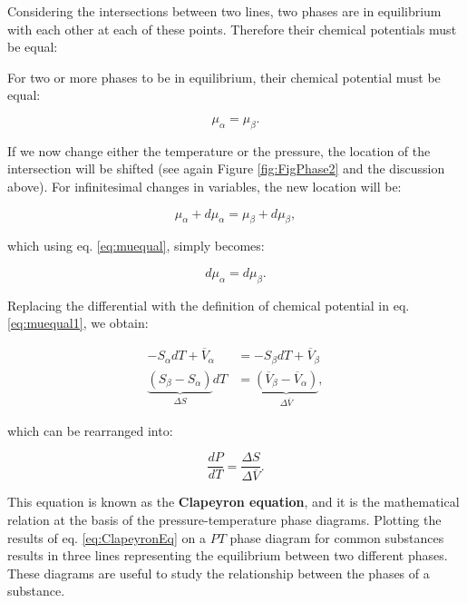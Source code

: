 \documentclass[
  9pt,
]{extbook}
\theoremstyle{definition}
\theoremstyle{definition}
\theoremstyle{definition}
\theoremstyle{definition}
\theoremstyle{remark}
\begin{document}
Considering the intersections between two lines, two phases are in equilibrium with each other at each of these points. Therefore their chemical potentials must be equal:

For two or more phases to be in equilibrium, their chemical potential must be equal:

\begin{equation}
\mu_{\alpha} = \mu_{\beta}.
\label{eq:muequal}
\end{equation}

If we now change either the temperature or the pressure, the location of the intersection will be shifted (see again Figure \ref{fig:FigPhase2} and the discussion above). For infinitesimal changes in variables, the new location will be:

\begin{equation}
\mu_{\alpha} + d\mu_{\alpha}= \mu_{\beta}+d\mu_{\beta},
\label{eq:muequalA}
\end{equation}

which using eq. \eqref{eq:muequal}, simply becomes:

\begin{equation}
d\mu_{\alpha}= d\mu_{\beta}.
\label{eq:muequalB}
\end{equation}

Replacing the differential with the definition of chemical potential in eq. \eqref{eq:muequal1}, we obtain:

\begin{equation}
\begin{aligned}
-S_{\alpha}dT+\overline{V}_{\alpha} &= -S_{\beta}dT+\overline{V}_{\beta} \\
\underbrace{\left(S_{\beta}-S_{\alpha}\right)}_{\Delta S} dT &= \underbrace{\left( \overline{V}_{\beta}-\overline{V}_{\alpha}\right)}_{\Delta \overline{V}},
\end{aligned}
\label{eq:muequalC}
\end{equation}

which can be rearranged into:

\begin{equation}
\frac{dP}{dT}=\frac{\Delta S}{\Delta \overline{V}}.
\label{eq:ClapeyronEq}
\end{equation}

This equation is known as the \textbf{Clapeyron equation}, and it is the mathematical relation at the basis of the pressure-temperature phase diagrams. Plotting the results of eq. \eqref{eq:ClapeyronEq} on a \(PT\) phase diagram for common substances results in three lines representing the equilibrium between two different phases. These diagrams are useful to study the relationship between the phases of a substance.
\end{document}
